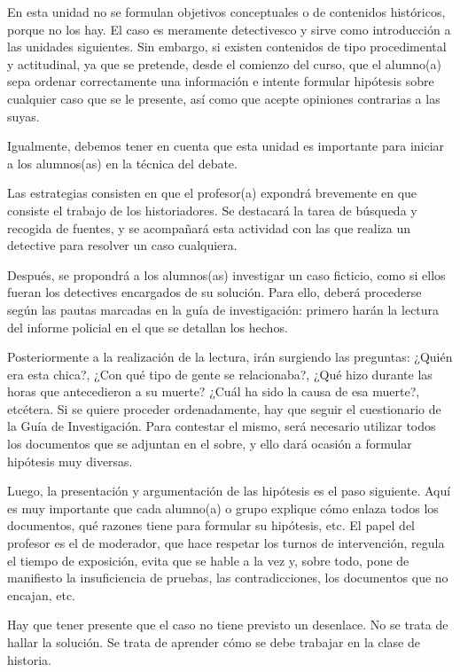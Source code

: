 En esta unidad no se formulan objetivos conceptuales o de contenidos 
históricos, porque no los hay. El caso es meramente detectivesco y 
sirve como introducción a las unidades siguientes. Sin embargo, si 
existen contenidos de tipo procedimental y actitudinal, ya que se 
pretende, desde el comienzo del curso, que el alumno(a) sepa ordenar 
correctamente una información e intente formular hipótesis sobre 
cualquier caso que se le presente, así como que acepte opiniones 
contrarias a las suyas.

 
Igualmente, debemos tener en cuenta que esta unidad es importante para 
iniciar a los alumnos(as) en la técnica del debate.

 
Las estrategias consisten en que el profesor(a) expondrá brevemente en 
que consiste el trabajo de los historiadores. Se destacará la tarea de 
búsqueda y recogida de fuentes, y se acompañará esta actividad con las 
que realiza un detective para resolver un caso cualquiera.

 
Después, se propondrá a los alumnos(as) investigar un caso ficticio, 
como si ellos fueran los detectives encargados de su solución. Para 
ello, deberá procederse según las pautas marcadas en la guía de 
investigación: primero harán la lectura del informe policial en el que 
se detallan los hechos. 

 
Posteriormente a la realización de la lectura, irán surgiendo las 
preguntas: ¿Quién era esta chica?, ¿Con qué tipo de gente se 
relacionaba?, ¿Qué hizo durante las horas que antecedieron a su muerte? 
¿Cuál ha sido la causa de esa muerte?, etcétera. Si se quiere proceder 
ordenadamente, hay que seguir el cuestionario de la Guía de 
Investigación. Para contestar el mismo, será necesario utilizar todos 
los documentos que se adjuntan en el sobre, y ello dará ocasión a 
formular hipótesis muy diversas.

Luego, la presentación y argumentación de las hipótesis es el 
paso siguiente. Aquí es muy importante que cada alumno(a) o grupo 
explique cómo enlaza todos los documentos, qué razones tiene para 
formular su hipótesis, etc. El papel del profesor es el de moderador, 
que hace respetar los turnos de intervención, regula el tiempo de 
exposición, evita que se hable a la vez y, sobre todo, pone de 
manifiesto la insuficiencia de pruebas, las contradicciones, los 
documentos que no encajan, etc.

Hay que tener presente que el caso no tiene previsto un desenlace. No 
se trata de hallar la solución. Se trata de aprender cómo se debe 
trabajar en la clase de historia.

